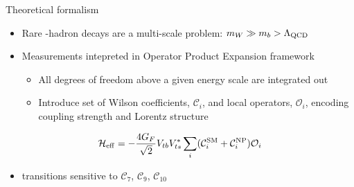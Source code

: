 \documentclass[aspectratio=1610]{beamer}
\begin{document}
\begin{frame}{Theoretical formalism}

\begin{itemize}
  \item Rare \bquark-hadron decays are a multi-scale problem: $m_{W} \gg m_{{b}} > \Lambda_{\rm QCD}$
  \item Measurements intepreted in Operator Product Expansion framework
  \begin{itemize}
  \item[\ding{70}] All degrees of freedom above a given energy scale are integrated out
  \item[\ding{70}] Introduce set of Wilson coefficients, $\mathcal{C}_{i}$, and local operators, $\mathcal{O}_{i}$, encoding coupling strength and Lorentz structure
  \end{itemize}
\end{itemize}
\begin{equation*}
\mathcal{H}_{\rm eff} = - \frac{4G_{F}}{\sqrt{2}}V_{tb}V^{*}_{ts}\sum_{i}(\mathcal{C}_{i}^{\rm SM}+\mathcal{C}_{i}^{\rm NP})\mathcal{O}_{i}
\end{equation*}
  
\begin{itemize}
\item \btosll transitions sensitive to $\mathcal{C}_{7}$, $\mathcal{C}_{9}$, $\mathcal{C}_{10}$
\end{itemize}

\medskip


\end{frame}
\end{document}
